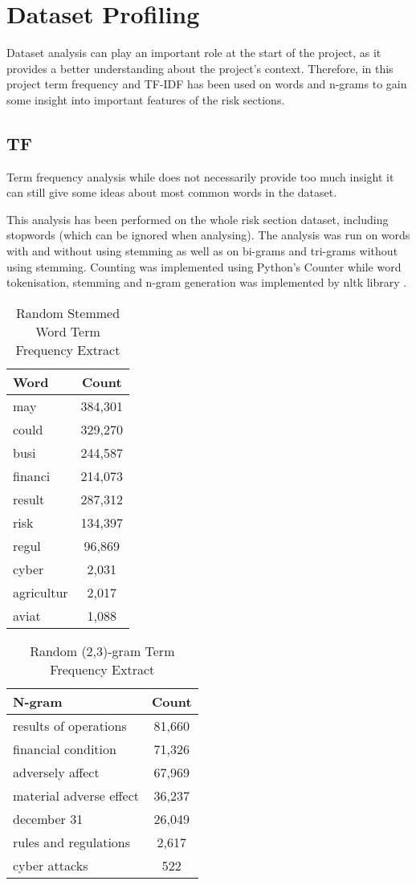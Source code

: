\section{Dataset Profiling}
Dataset analysis can play an important role at the start of the project, as it provides a better understanding about the project's context. Therefore, in this project term frequency and TF-IDF has been used on words and n-grams to gain some insight into important features of the risk sections.

\subsection{TF}
Term frequency analysis while does not necessarily provide too much insight it can still give some ideas about most common words in the dataset. 

This analysis has been performed on the whole risk section dataset, including stopwords (which can be ignored when analysing). The analysis was run on words with and without using stemming as well as on bi-grams and tri-grams without using stemming. Counting was implemented using Python's Counter while word tokenisation, stemming and n-gram generation was implemented by nltk library \cite{nltkhome}.

\begin{table}[H]
\centering
\begin{tabular}{|l|c|}
\hline
Word & Count \\
\hline
may & 384,301\\\hline
could & 329,270\\\hline
busi & 244,587\\\hline
financi & 214,073\\\hline
result & 287,312\\\hline
risk & 134,397\\\hline
regul & 96,869\\\hline
cyber & 2,031\\\hline
agricultur & 2,017\\\hline
aviat & 1,088\\\hline
\end{tabular}
\caption{Random Stemmed Word Term Frequency Extract}
\label{table:tfstem}
\end{table}

\begin{table}[H]
\centering
\begin{tabular}{|l|c|}
\hline
N-gram & Count \\
\hline
results of operations & 81,660\\\hline
financial condition & 71,326\\\hline
adversely affect & 67,969\\\hline
material adverse effect & 36,237\\\hline
december 31 & 26,049\\\hline
rules and regulations & 2,617\\\hline
cyber attacks & 522\\\hline
\end{tabular}
\caption{Random (2,3)-gram Term Frequency Extract}
\label{table:tfngrams}
\end{table}

